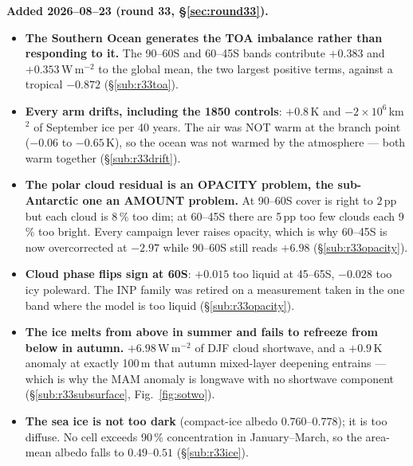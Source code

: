 \documentclass[10pt]{article}
\begin{document}
\textbf{Added 2026--08--23 (round 33, \S\ref{sec:round33}).}
\begin{itemize}\itemsep2pt
\item \textbf{The Southern Ocean generates the TOA imbalance rather than responding to
it.} The 90--60S and 60--45S bands contribute $+0.383$ and $+0.353$\,W\,m$^{-2}$ to the
global mean, the two largest positive terms, against a tropical $-0.872$
(\S\ref{sub:r33toa}).
\item \textbf{Every arm drifts, including the 1850 controls}: $+0.8$\,K and
$-2\times10^6$\,km$^2$ of September ice per 40 years. The air was NOT warm at the branch
point ($-0.06$ to $-0.65$\,K), so the ocean was not warmed by the atmosphere --- both
warm together (\S\ref{sub:r33drift}).
\item \textbf{The polar cloud residual is an OPACITY problem, the sub-Antarctic one an
AMOUNT problem.} At 90--60S cover is right to $2$\,pp but each cloud is 8\,\% too dim; at
60--45S there are 5\,pp too few clouds each 9\,\% too bright. Every campaign lever raises
opacity, which is why 60--45S is now overcorrected at $-2.97$ while 90--60S still reads
$+6.98$ (\S\ref{sub:r33opacity}).
\item \textbf{Cloud phase flips sign at 60S}: $+0.015$ too liquid at 45--65S, $-0.028$ too
icy poleward. The INP family was retired on a measurement taken in the one band where the
model is too liquid (\S\ref{sub:r33opacity}).
\item \textbf{The ice melts from above in summer and fails to refreeze from below in
autumn.} $+6.98$\,W\,m$^{-2}$ of DJF cloud shortwave, and a $+0.9$\,K anomaly at exactly
100\,m that autumn mixed-layer deepening entrains --- which is why the MAM anomaly is
longwave with no shortwave component (\S\ref{sub:r33subsurface},
Fig.~\ref{fig:sotwo}).
\item \textbf{The sea ice is not too dark} (compact-ice albedo $0.760$--$0.778$); it is
too diffuse. No cell exceeds 90\,\% concentration in January--March, so the area-mean
albedo falls to $0.49$--$0.51$ (\S\ref{sub:r33ice}).
\end{itemize}
\end{document}

